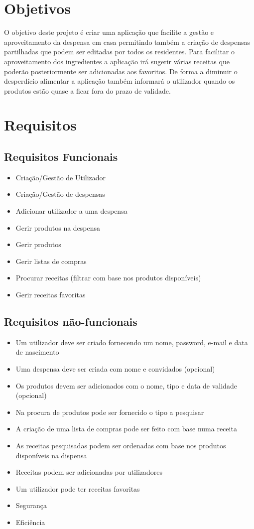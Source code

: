 \documentclass[a4paper]{report}
\begin{document}
\section{Objetivos}
O objetivo deste projeto é criar uma aplicação que facilite a gestão e
aproveitamento da despensa em casa permitindo também a criação de despensas
partilhadas que podem ser editadas por todos os residentes.
Para facilitar o aproveitamento dos ingredientes a aplicação irá sugerir várias
receitas que poderão posteriormente ser adicionadas aos favoritos. De forma a
diminuir o desperdício alimentar a aplicação também informará o utilizador
quando os produtos estão quase a ficar fora do prazo de validade.

\section{Requisitos}
\subsection{Requisitos Funcionais}
\begin{itemize}
    \item Criação/Gestão de Utilizador
    \item Criação/Gestão de despensas
    \item Adicionar utilizador a uma despensa
    \item Gerir produtos na despensa
    \item Gerir produtos
    \item Gerir listas de compras
    \item Procurar receitas (filtrar com base nos produtos disponíveis)
    \item Gerir receitas favoritas
\end{itemize}

\subsection{Requisitos não-funcionais}
\begin{itemize}
    \item Um utilizador deve ser criado fornecendo um nome, password, e-mail e
        data de nascimento
    \item Uma despensa deve ser criada com nome e convidados (opcional)
    \item Os produtos devem ser adicionados com o nome, tipo e data de validade
        (opcional)
    \item Na procura de produtos pode ser fornecido o tipo a pesquisar
    \item A criação de uma lista de compras pode ser feito com base numa receita
    \item As receitas pesquisadas podem ser ordenadas com base nos produtos
        disponíveis na dispensa
    \item Receitas podem ser adicionadas por utilizadores
    \item Um utilizador pode ter receitas favoritas
    \item Segurança
    \item Eficiência
\end{itemize}
\end{document}
